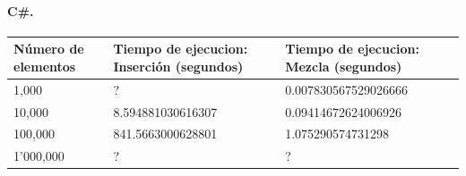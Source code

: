 \documentclass[11pt]{article}
\begin{document}
\paragraph{C\#.}\label{c.}

\begin{longtable}[]{@{}lll@{}}
\toprule
\begin{minipage}[b]{0.16\columnwidth}\raggedright\strut
Número de elementos\strut
\end{minipage} & \begin{minipage}[b]{0.18\columnwidth}\raggedright\strut
Tiempo de ejecucion: Inserción (segundos)\strut
\end{minipage} & \begin{minipage}[b]{0.18\columnwidth}\raggedright\strut
Tiempo de ejecucion: Mezcla (segundos)\strut
\end{minipage}\tabularnewline
\midrule
\endhead
\begin{minipage}[t]{0.16\columnwidth}\raggedright\strut
1,000\strut
\end{minipage} & \begin{minipage}[t]{0.18\columnwidth}\raggedright\strut
?\strut
\end{minipage} & \begin{minipage}[t]{0.18\columnwidth}\raggedright\strut
0.007830567529026666\strut
\end{minipage}\tabularnewline
\begin{minipage}[t]{0.16\columnwidth}\raggedright\strut
10,000\strut
\end{minipage} & \begin{minipage}[t]{0.18\columnwidth}\raggedright\strut
8.594881030616307\strut
\end{minipage} & \begin{minipage}[t]{0.18\columnwidth}\raggedright\strut
0.09414672624006926\strut
\end{minipage}\tabularnewline
\begin{minipage}[t]{0.16\columnwidth}\raggedright\strut
100,000\strut
\end{minipage} & \begin{minipage}[t]{0.18\columnwidth}\raggedright\strut
841.5663000628801\strut
\end{minipage} & \begin{minipage}[t]{0.18\columnwidth}\raggedright\strut
1.075290574731298\strut
\end{minipage}\tabularnewline
\begin{minipage}[t]{0.16\columnwidth}\raggedright\strut
1'000,000\strut
\end{minipage} & \begin{minipage}[t]{0.18\columnwidth}\raggedright\strut
?\strut
\end{minipage} & \begin{minipage}[t]{0.18\columnwidth}\raggedright\strut
?\strut
\end{minipage}\tabularnewline
\bottomrule
\end{longtable}
\end{document}
